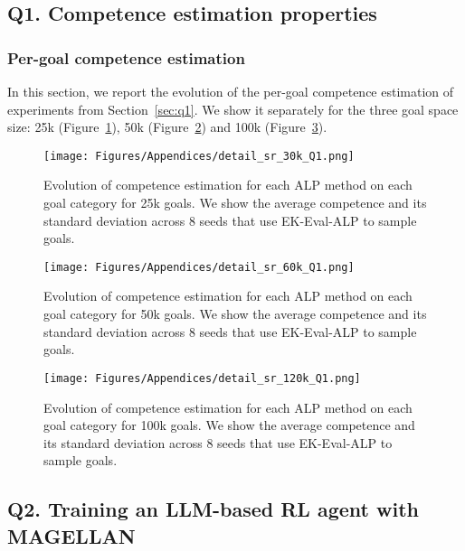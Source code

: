 \newpage
\subsection{Q1. Competence estimation properties} \label{app:additional_results_q1}

\subsubsection{Per-goal competence estimation}
\label{app:per_goal_error}
In this section, we report the evolution of the per-goal competence estimation of experiments from Section~\ref{sec:q1}. We show it separately for the three goal space size: 25k (Figure~\ref{fig:detail_sr_25k_Q1}), 50k (Figure~\ref{fig:detail_sr_50k_Q1}) and 100k (Figure~\ref{fig:detail_sr_100k_Q1}).

\begin{figure}[H]
    \centering
    \texttt{[image: Figures/Appendices/detail\_sr\_30k\_Q1.png]}
    \caption{Evolution of competence estimation for each ALP method on each goal category for 25k goals. We show the average competence and its standard deviation across 8 seeds that use EK-Eval-ALP to sample goals.}
    \label{fig:detail_sr_25k_Q1}
\end{figure}

\begin{figure}[H]
    \centering
    \texttt{[image: Figures/Appendices/detail\_sr\_60k\_Q1.png]}
    \caption{Evolution of competence estimation for each ALP method on each goal category for 50k goals. We show the average competence and its standard deviation across 8 seeds that use EK-Eval-ALP to sample goals.}
    \label{fig:detail_sr_50k_Q1}
\end{figure}

\begin{figure}[H]
    \centering
    \texttt{[image: Figures/Appendices/detail\_sr\_120k\_Q1.png]}
    \caption{Evolution of competence estimation for each ALP method on each goal category for 100k goals. We show the average competence and its standard deviation across 8 seeds that use EK-Eval-ALP to sample goals.}
    \label{fig:detail_sr_100k_Q1}
\end{figure}

\newpage
\subsection{Q2. Training an LLM-based RL agent with MAGELLAN } 
\label{app:additional_results_q2}

